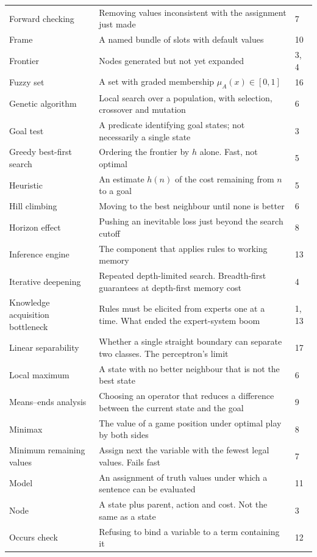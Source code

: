 \begin{longtable}{@{}L{3.6cm}L{10.2cm}L{1.0cm}@{}}
Forward checking & Removing values inconsistent with the assignment just made &
7 \\
Frame & A named bundle of slots with default values & 10 \\
Frontier & Nodes generated but not yet expanded & 3, 4 \\
Fuzzy set & A set with graded membership $\mu_{A}(x) \in [0,1]$ & 16 \\
Genetic algorithm & Local search over a population, with selection, crossover and
mutation & 6 \\
Goal test & A predicate identifying goal states; not necessarily a single state &
3 \\
Greedy best-first search & Ordering the frontier by $h$ alone. Fast, not optimal &
5 \\
Heuristic & An estimate $h(n)$ of the cost remaining from $n$ to a goal & 5 \\
Hill climbing & Moving to the best neighbour until none is better & 6 \\
Horizon effect & Pushing an inevitable loss just beyond the search cutoff & 8 \\
Inference engine & The component that applies rules to working memory & 13 \\
Iterative deepening & Repeated depth-limited search. Breadth-first guarantees at
depth-first memory cost & 4 \\
Knowledge acquisition bottleneck & Rules must be elicited from experts one at a
time. What ended the expert-system boom & 1, 13 \\
Linear separability & Whether a single straight boundary can separate two
classes. The perceptron's limit & 17 \\
Local maximum & A state with no better neighbour that is not the best state & 6 \\
Means--ends analysis & Choosing an operator that reduces a difference between the
current state and the goal & 9 \\
Minimax & The value of a game position under optimal play by both sides & 8 \\
Minimum remaining values & Assign next the variable with the fewest legal values.
Fails fast & 7 \\
Model & An assignment of truth values under which a sentence can be evaluated &
11 \\
Node & A state plus parent, action and cost. Not the same as a state & 3 \\
Occurs check & Refusing to bind a variable to a term containing it & 12 \\

\end{longtable}
